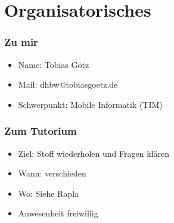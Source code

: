 \section{Organisatorisches}
\begin{frame}
    \frametitle{Zu mir}
    \begin{itemize}
        \item Name: Tobias Götz
        \item Mail: dhbw@tobiasgoetz.de
        \item Schwerpunkt: Mobile Informatik (TIM)
    \end{itemize}
\end{frame}

\begin{frame}
    \frametitle{Zum Tutorium}
    \begin{itemize}
        \item Ziel: Stoff wiederholen und Fragen klären
        \item Wann: verschieden
        \item Wo: Siehe Rapla
        \item Anwesenheit freiwillig
    \end{itemize}
\end{frame}
